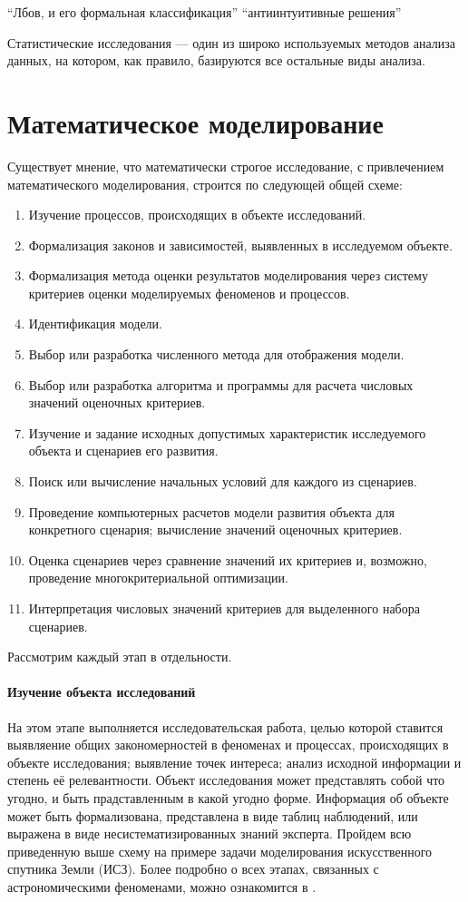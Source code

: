 \documentclass[12pt, openany, twoside]{book} %
\begin{document}
``Лбов, и его формальная классификация''
``антиинтуитивные решения''

Статистические исследования --– один из широко используемых методов анализа данных, на котором, как правило, базируются все остальные виды анализа.

\section{Математическое моделирование}



Существует мнение, что математически строгое исследование, с привлечением математического моделирования, строится по следующей общей схеме:
\begin{enumerate}
\item Изучение процессов, происходящих в объекте исследований.
\item Формализация законов и зависимостей, выявленных в исследуемом объекте.
\item Формализация метода оценки результатов моделирования через систему критериев оценки моделируемых феноменов и процессов.
\item Идентификация модели.
\item Выбор или разработка численного метода для отображения модели.
\item Выбор или разработка алгоритма и программы для расчета числовых значений оценочных критериев.
\item Изучение и задание исходных допустимых характеристик исследуемого объекта и сценариев его развития.
\item Поиск или вычисление начальных условий для каждого из сценариев.
\item Проведение компьютерных расчетов модели развития объекта для конкретного сценария; вычисление значений оценочных критериев.
\item Оценка сценариев через сравнение значений их критериев и, возможно, проведение многокритериальной оптимизации.
\item Интерпретация числовых значений критериев для выделенного набора сценариев.
\end{enumerate}

Рассмотрим каждый этап в отдельности.

\paragraph{Изучение объекта исследований} На этом этапе выполняется исследовательская работа, целью которой ставится выявляение общих закономерностей в феноменах и процессах, происходящих в объекте исследования; выявление точек интереса; анализ исходной информации и степень её релевантности. Объект исследования может представлять собой что угодно, и быть прадставленным в какой угодно форме. Информация об объекте может быть формализована, представлена в виде таблиц наблюдений, или выражена в виде несистематизированных знаний эксперта. Пройдем всю приведенную выше схему на примере задачи моделирования искусственного спутника Земли (ИСЗ). Более подробно о всех этапах, связанных с астрономическими феноменами, можно ознакомится в \cite{avanta}.
\end{document}
